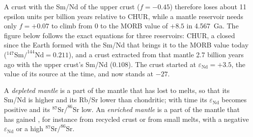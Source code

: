 A crust with the Sm/Nd of the upper crust ($f = -0.45$) therefore loses about
11 epsilon units per billion years relative to CHUR, while a mantle reservoir
needs only $f = +0.07$ to climb from 0 to the MORB value of $+8.5$ in
\qty{4.567}{Ga}. The figure below follows the exact equations for three
reservoirs: CHUR, a  closed since the Earth formed with the Sm/Nd
that brings it to the MORB value today ($^{147}\mathrm{Sm}/^{144}\mathrm{Nd} =
0.211$), and a crust extracted from that mantle 2.7 billion years ago with the
upper crust's Sm/Nd ($0.108$). The crust started at $\varepsilon_{\mathrm{Nd}} =
+3.5$, the value of its source at the time, and now stands at $-27$.

\begin{definition}\label{def:b2:isotope-geochemistry:reservoirs}
A \emph{depleted mantle} is a part of the mantle that has
lost  to melts, so that its Sm/Nd is higher and its Rb/Sr
lower than chondritic; with time its $\varepsilon_{\mathrm{Nd}}$ becomes positive and
its $^{87}\mathrm{Sr}/^{86}\mathrm{Sr}$ low. An \emph{enriched
mantle} is a part of the mantle that has gained
, for instance from recycled crust or from small melts,
with a negative $\varepsilon_{\mathrm{Nd}}$ or a high $^{87}\mathrm{Sr}/^{86}\mathrm{Sr}$.
\end{definition}

